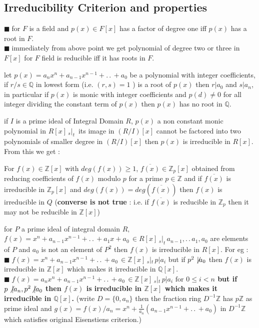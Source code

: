 \documentclass[11pt]{extarticle}
\newcommand{\Z}{\mathbb{Z}}
\newcommand{\Q}{\mathbb{Q}}
\newcommand{\w}[1]{\text{#1}}
\newcommand{\ck}{.\,.\,}
\newcommand{\snote}[1]{{\footnotesize(#1)}}
\newcommand{\st}{\,{}_{s}|_t\,}
\newcommand{\tbx}[2][]{
	\begin{tcolorbox}[enhanced,breakable,size=small,colback=black!2!white,title={#1},arc is angular, arc=1.5mm,drop fuzzy shadow]
		#2
	\end{tcolorbox}
}
\newcommand{\y}{$\blacksquare\;$}
\begin{document}
\begin{multicols}{2}
\subsection{Irreducibility Criterion and properties}
\tbx{
\y for $ F $ is a field and $ p(x)\in F[x] $ has a factor of degree one iff $ p(x) $ has a root in $ F$.\\
\y immediately from above point we get polynomial of degree two or three in $ F[x] $ for $ F $ field is reducible  iff it has roots in $ F $.}
\tbx[Rational root Theorem]{ let $ p(x)=a_nx^n+a_{n-1}x^{n-1}+\ck + a_0 $ be a polynomial with integer coefficients, if $ r/s \in \Q$ in lowest form \snote{i.e. $ (r,s) =1$ } is a root of $ p(x) $ then $ r|a_0 $ and $ s|a_n $, in particular if  $ p(x)$ is monic with integer coefficients and $ p(d)\neq 0 $ for all integer dividing the constant term of $ p(x) $ then 
	$ p(x) $  has no root in $ \Q $.}
\tbx{if $ I $ is a prime ideal of Integral Domain $ R $, $ p(x) $ a non constant monic polynomial in $ R[x]\st $ its image in $ (R/I)[x] $ cannot be factored into two polynomials of smaller degree in $ (R/I)[x] $ then $ p(x) $ is irreducible in $ R[x] $. From this we get :
\tbx[\textbf{Mod $ p $ irreducibility test} ]{For $ f(x)\in \Z[x] $ with $ deg(f(x))\geq 1 $, $ \overline{f(x)} \in \Z_p[x]$ obtained from reducing coefficients of $ f(x) $ modulo $ p $ for a prime $ p\in \Z $ and  if $ \overline{f(x)} $ is irreducible in $ \Z_p[x] $ and $ deg(f(x))=deg(\overline{f(x)}) $ then $ f(x) $ is irreducible in $ Q$  \snote{\textbf{converse is not true} : i.e. if $ \overline{f(x)} $ is reducible in $ \Z_p $ then it may not be reducible in $ \Z[x] $}} }
			
\tbx[\textbf{Eisenstein's Criterion}]{  for $ P $ a prime ideal of integral domain $ R,$  
			$ f(x)=x^n +a_{n-1}x^{n-1}+\ck + a_1x+a_0 \, \in R[x] \st a_{n-1},\ck a_1,a_0$ are elements of $ P $ and $ a_0 $ is not an element of $ P^2 $ then $ f(x) $ is irreducible in $ R[x] $.
			For  eg : \\
			\y $ f(x)=x^n+ a_{n-1}x^{n-1}+\ck + a_0 \, \in \Z[x] \st p|a_i$ but if $ p^2 \not\!| a_0 $ then $ f(x) $ is irreducible in $ \Z[x] $ which makes it irreducible in $ \Q[x] $.\\
			\y \textbf{$ f(x)=a_n x^n +a_{n-1}x^{n-1}+\ck + a_0 \, \in \Z[x] \st p|a_i \w{ for } 0\leq i<n$ 
				but if $p\not| a_n, \\ p^2\!\not| a_0 $ then $ f(x) $ is irreducible in $ \Z[x] $ which makes it irreducible in $ \Q[x] $.} \snote{write $ D=\{0,a_n\} $ then the fraction ring $ D^{-1}\Z $ has $p\Z $ as prime ideal and $ g(x)=f(x)/a_n  =x^n +\frac{ 1 }{a_n} (a_{n-1}x^{n-1}+\ck + a_0 )$ in $ D^{-1}\Z $ which satisfies original Eisenstiens criterion.}}
			

\end{multicols}
\end{document}
